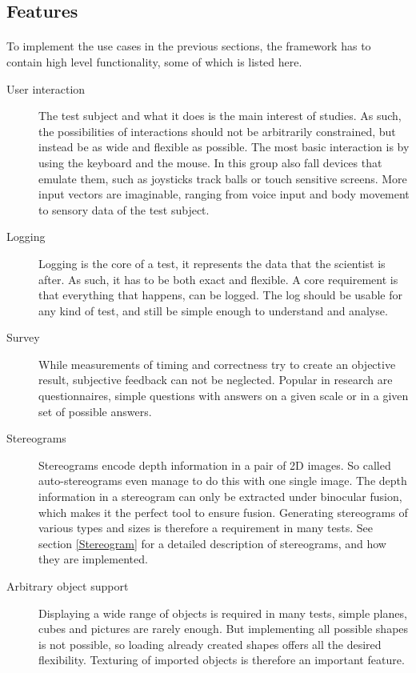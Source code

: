 \subsection{Features}
\paragraph{}
To implement the use cases in the previous sections, the framework has to contain high level functionality, some of which is listed here.

\begin{description}
\item[User interaction]
The test subject and what it does is the main interest of studies.
As such, the possibilities of interactions should not be arbitrarily constrained, but instead be as wide and flexible as possible.
The most basic interaction is by using the keyboard and the mouse.
In this group also fall devices that emulate them, such as joysticks track balls or touch sensitive screens.
More input vectors are imaginable, ranging from voice input and body movement to sensory data of the test subject.

\item[Logging]
Logging is the core of a test, it represents the data that the scientist is after.
As such, it has to be both exact and flexible.
A core requirement is that everything that happens, can be logged.
The log should be usable for any kind of test, and still be simple enough to understand and analyse.

\item[Survey]
While measurements of timing and correctness try to create an objective result, subjective feedback can not be neglected.
Popular in research are questionnaires, simple questions with answers on a given scale or in a given set of possible answers.

\item[Stereograms]
Stereograms encode depth information in a pair of 2D images.
So called auto-stereograms even manage to do this with one single image.
The depth information in a stereogram can only be extracted under binocular fusion, which makes it the perfect tool to ensure fusion.
Generating stereograms of various types and sizes is therefore a requirement in many tests.
See section \ref{Stereogram} for a detailed description of stereograms, and how they are implemented.

\item[Arbitrary object support]
Displaying a wide range of objects is required in many tests, simple planes, cubes and pictures are rarely enough.
But implementing all possible shapes is not possible, so loading already created shapes offers all the desired flexibility.
Texturing of imported objects is therefore an important feature.


\end{description}
